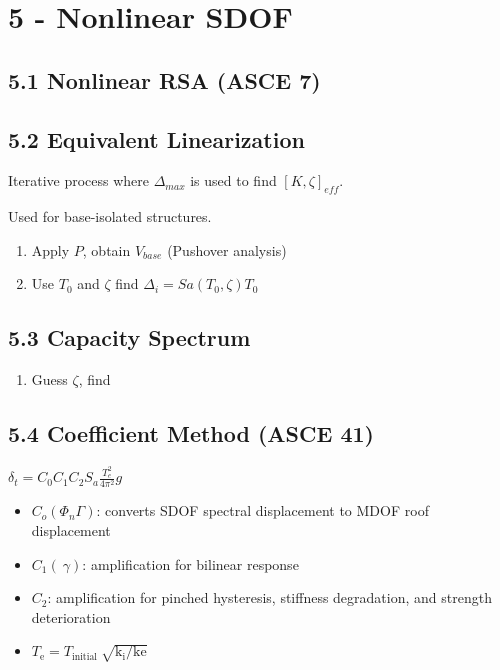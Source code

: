 \hypertarget{nonlinear-sdof}{%
\section{5 - Nonlinear SDOF}\label{nonlinear-sdof}}

\hypertarget{nonlinear-rsa-asce-7}{%
\subsection{5.1 Nonlinear RSA (ASCE 7)}\label{nonlinear-rsa-asce-7}}

\hypertarget{equivalent-linearization}{%
\subsection{5.2 Equivalent
Linearization}\label{equivalent-linearization}}

Iterative process where \(\Delta_{max}\) is used to find
\([K,\zeta]_{eff}\).

Used for base-isolated structures.

\begin{enumerate}
\def\labelenumi{\arabic{enumi}.}
\tightlist
\item
  Apply \(P\), obtain \(V_{base}\) (Pushover analysis)
\item
  Use \(T_0\) and \(\zeta\) find \(\Delta_i = Sa(T_0,\zeta)T_0\)
\end{enumerate}

\hypertarget{capacity-spectrum}{%
\subsection{5.3 Capacity Spectrum}\label{capacity-spectrum}}

\begin{enumerate}
\def\labelenumi{\arabic{enumi}.}
\tightlist
\item
  Guess \(\zeta\), find
\end{enumerate}

\hypertarget{coefficient-method-asce-41}{%
\subsection{5.4 Coefficient Method (ASCE
41)}\label{coefficient-method-asce-41}}

\(\delta_{t}=C_{0} C_{1} C_{2} S_{a} \frac{T_{e}^{2}}{4 \pi^{2}} g\)\\

\begin{itemize}
\tightlist
\item
  \(C_{o}(\Phi_n\Gamma)\): converts SDOF spectral displacement to MDOF
  roof displacement
\item
  \(C_{1}(~\gamma)\): amplification for bilinear response
\item
  \(C_{2}\): amplification for pinched hysteresis, stiffness
  degradation, and strength deterioration
\item
  \(T_{\text {e}}=T_{\text {initial }} \sqrt{\mathrm{k}_{\mathrm{i}} / \mathrm{ke}}\)
\end{itemize}

